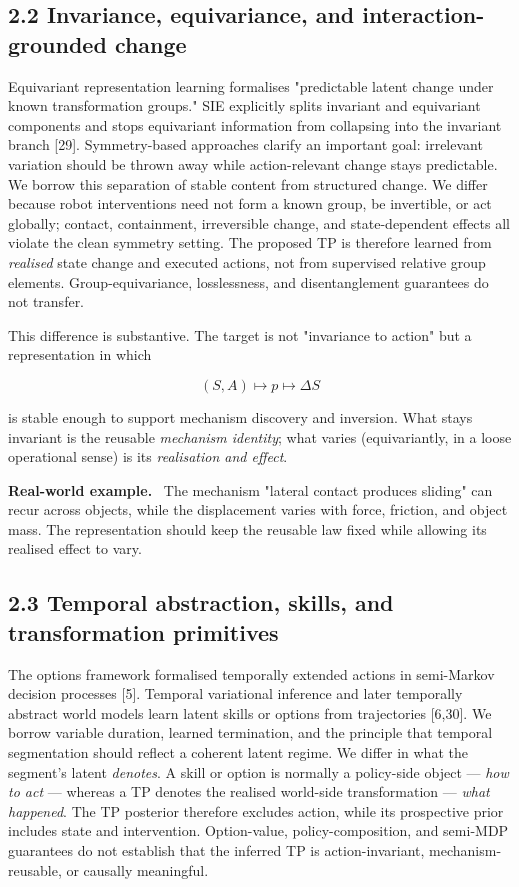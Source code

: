 \documentclass[11pt]{article}
\newenvironment{example}{%
  \par\smallskip\noindent\begin{minipage}{\textwidth}%
  \color{teal!60!black}\small
  \textbf{\color{teal!70!black}Real-world example.}\
}{%
  \end{minipage}\par\smallskip}
\begin{document}
\subsection*{2.2 Invariance, equivariance, and interaction-grounded change}

Equivariant representation learning formalises "predictable latent change under known transformation groups." SIE explicitly
splits invariant and equivariant components and stops equivariant information from collapsing into the invariant branch [29].
Symmetry-based approaches clarify an important goal: irrelevant variation should be thrown away while action-relevant change stays
predictable. We borrow this separation of stable content from structured change. We differ because robot interventions need not
form a known group, be invertible, or act globally; contact, containment, irreversible change, and state-dependent effects all
violate the clean symmetry setting. The proposed TP is therefore learned from \emph{realised} state change and executed actions,
not from supervised relative group elements. Group-equivariance, losslessness, and disentanglement guarantees do not transfer.

This difference is substantive. The target is not "invariance to action" but a representation in which

\[
\boxed{(S,A)\mapsto p\mapsto \Delta S}
\]

is stable enough to support mechanism discovery and inversion. What stays invariant is the reusable \emph{mechanism identity};
what varies (equivariantly, in a loose operational sense) is its \emph{realisation and effect}.

\begin{example}
The mechanism "lateral contact produces sliding" can recur across objects, while the displacement varies with force, friction, and
object mass. The representation should keep the reusable law fixed while allowing its realised effect to vary.
\end{example}

\subsection*{2.3 Temporal abstraction, skills, and transformation primitives}

The options framework formalised temporally extended actions in semi-Markov decision processes [5]. Temporal variational
inference and later temporally abstract world models learn latent skills or options from trajectories [6,30]. We borrow variable
duration, learned termination, and the principle that temporal segmentation should reflect a coherent latent regime. We differ in
what the segment's latent \emph{denotes}. A skill or option is normally a policy-side object --- \emph{how to act} --- whereas a TP
denotes the realised world-side transformation --- \emph{what happened}. The TP posterior therefore excludes action, while its
prospective prior includes state and intervention. Option-value, policy-composition, and semi-MDP guarantees do not establish that
the inferred TP is action-invariant, mechanism-reusable, or causally meaningful.
\end{document}
